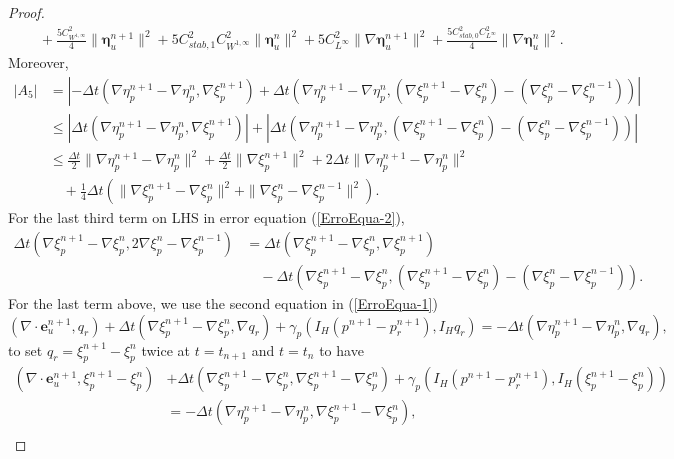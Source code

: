 \documentclass[10pt,twoside,openany,UTF8,CJK]{article}
\begin{document}
\begin{proof}
$$\begin{aligned}
		&\quad+ \frac{5C^2_{W^{1,\infty}}}{4}\|\boldsymbol{\eta}^{n+1}_u\|^2 + 5C^2_{stab,1} C^2_{W^{1,\infty}}\|\boldsymbol{\eta}^n_u\|^2 + 5C^2_{L^{\infty}}\|\nabla\boldsymbol{\eta}^{n+1}_u\|^2 + \frac{5C^2_{stab,0} C^2_{L^{\infty}}}{4}\|\nabla\boldsymbol{\eta}^{n}_u\|^2.
    \end{aligned}
    $$		
	Moreover,
	$$
	\begin{aligned}		
		|A_5| &= |- \Delta t(\nabla \eta^{n+1}_p - \nabla \eta^n_p, \nabla\xi^{n+1}_p) + \Delta t(\nabla \eta^{n+1}_p - \nabla \eta^n_p, (\nabla\xi^{n+1}_p - \nabla\xi^{n}_p) - (\nabla\xi^{n}_p - \nabla\xi^{n-1}_p))| \\
		&\leq |\Delta t(\nabla \eta^{n+1}_p - \nabla \eta^n_p, \nabla\xi^{n+1}_p)| + |\Delta t(\nabla \eta^{n+1}_p - \nabla \eta^n_p, (\nabla\xi^{n+1}_p - \nabla\xi^{n}_p) - (\nabla\xi^{n}_p - \nabla\xi^{n-1}_p))|	\\
		&\leq \frac{\Delta t}{2}\|\nabla \eta^{n+1}_p - \nabla \eta^n_p\|^2 + \frac{\Delta t}{2}\|\nabla\xi^{n+1}_p\|^2 + 2\Delta t\|\nabla \eta^{n+1}_p - \nabla \eta^n_p\|^2 \\
		&\quad+ \frac14\Delta t\left(\|\nabla\xi^{n+1}_p - \nabla\xi^{n}_p\|^2 + \|\nabla\xi^{n}_p - \nabla\xi^{n-1}_p\|^2\right).
    \end{aligned}
    $$		
	For the last third term on LHS in error equation (\ref{ErroEqua-2}),
	$$
	\begin{aligned}
		\Delta t(\nabla\xi^{n+1}_p - \nabla\xi^{n}_p, 2\nabla\xi^{n}_p - \nabla\xi^{n-1}_p) &= \Delta t(\nabla\xi^{n+1}_p - \nabla\xi^{n}_p, \nabla\xi^{n+1}_p) \\
		&\quad- \Delta t(\nabla\xi^{n+1}_p - \nabla\xi^{n}_p, (\nabla\xi^{n+1}_p - \nabla\xi^{n}_p) - (\nabla\xi^{n}_p - \nabla\xi^{n-1}_p)).
    \end{aligned}
	$$	
	For the last term above, we use the second equation in (\ref{ErroEqua-1})
	$$
	(\nabla\cdot \boldsymbol{e}^{n+1}_u, q_r) + \Delta t(\nabla\xi^{n+1}_p - \nabla\xi^{n}_p, \nabla q_r) + \gamma_p(I_H(p^{n+1}-p^{n+1}_r), I_Hq_r) = -\Delta t(\nabla\eta^{n+1}_p - \nabla\eta^{n}_p, \nabla q_r),
	$$	
	to set $q_r = \xi^{n+1}_p - \xi^{n}_p$	 twice at $t=t_{n+1}$ and $t=t_{n}$ to have
	$$
	\begin{aligned}
		(\nabla\cdot \boldsymbol{e}^{n+1}_u, \xi^{n+1}_p - \xi^{n}_p) &+ \Delta t(\nabla\xi^{n+1}_p - \nabla\xi^{n}_p, \nabla \xi^{n+1}_p - \nabla\xi^{n}_p) + \gamma_p(I_H(p^{n+1}-p^{n+1}_r), I_H(\xi^{n+1}_p - \xi^{n}_p)) \\
		&= -\Delta t(\nabla\eta^{n+1}_p - \nabla\eta^{n}_p, \nabla \xi^{n+1}_p - \nabla\xi^{n}_p), \\

\end{aligned}$$
\end{proof}
\end{document}
